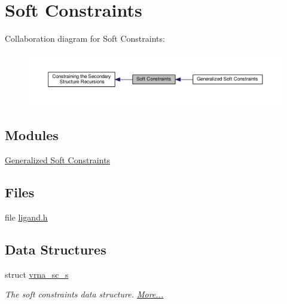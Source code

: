 \hypertarget{group__soft__constraints}{\section{Soft Constraints}
\label{group__soft__constraints}
}
Collaboration diagram for Soft Constraints\-:
\nopagebreak
\begin{figure}[H]
\begin{center}
\leavevmode
\includegraphics[width=350pt]{group__soft__constraints}
\end{center}
\end{figure}
\subsection*{Modules}
\begin{DoxyCompactItemize}
\item 
\hyperlink{group__generalized__sc}{Generalized Soft Constraints}
\end{DoxyCompactItemize}
\subsection*{Files}
\begin{DoxyCompactItemize}
\item 
file \hyperlink{ligand_8h}{ligand.\-h}
\end{DoxyCompactItemize}
\subsection*{Data Structures}
\begin{DoxyCompactItemize}
\item 
struct \hyperlink{group__soft__constraints_structvrna__sc__s}{vrna\-\_\-sc\-\_\-s}
\begin{DoxyCompactList}\small\item\em The soft constraints data structure.  \hyperlink{group__soft__constraints_structvrna__sc__s}{More...}\end{DoxyCompactList}\end{DoxyCompactItemize}
